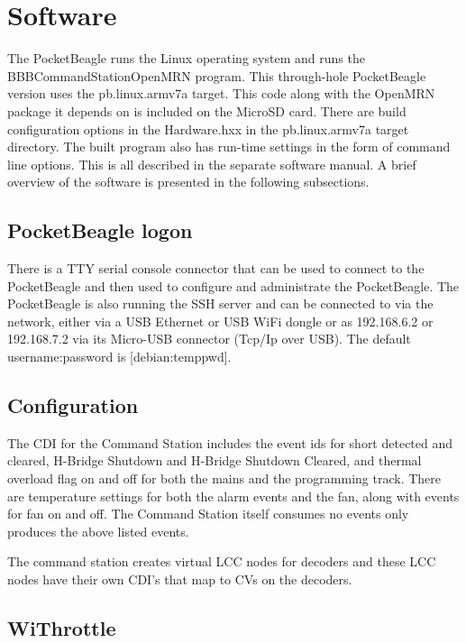 \section{Software}

The PocketBeagle runs the Linux operating system and runs the
BBBCommandStationOpenMRN program. This through-hole PocketBeagle version uses
the pb.linux.armv7a target. This code along with the OpenMRN package it
depends on is included on the MicroSD card. There are build configuration
options in the Hardware.hxx in the pb.linux.armv7a target directory. The built
program also has run-time settings in the form of command line options. This
is all described in the separate software manual. A brief overview of the
software is presented in the following subsections.

\subsection{PocketBeagle logon}

There is a TTY serial console connector that can be used to connect to the 
PocketBeagle and then used to configure and administrate the PocketBeagle. The 
PocketBeagle is also running the SSH server and can be connected to via the 
network, either via a  USB Ethernet or USB WiFi dongle or as 192.168.6.2 or 
192.168.7.2 via its Micro-USB connector (Tcp/Ip over USB).  The default 
username:password is [debian:temppwd].

\subsection{Configuration}

The CDI for the Command Station includes the event ids for short detected and 
cleared, H-Bridge Shutdown and H-Bridge Shutdown Cleared, and thermal overload 
flag on and off for both the mains and the programming track.  There are 
temperature settings for both the alarm events and the fan, along with events 
for fan on and off.  The Command Station itself consumes no events only 
produces the above listed events.

The command station creates virtual LCC nodes for decoders and these LCC nodes 
have their own CDI's that map to CVs on the decoders.

\subsection{WiThrottle}

